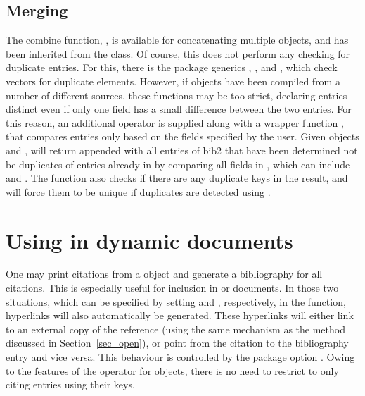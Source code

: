 \documentclass[article]{jss}\usepackage[]{graphicx}\usepackage[]{color}
\newcommand{\ourpkg}{\pkg{RefManageR}}
\newcommand{\bt}{\`{}}
\begin{document}
\subsection{Merging}
The combine function, , is available for concatenating multiple  objects, and has been inherited from the  class.  Of course, this does not perform any checking for duplicate entries.  For this, there is the  package generics , , and , which check vectors for duplicate elements.  However, if  objects have been compiled from a number of different sources, these functions may be too strict, declaring entries distinct even if only one field has a small difference between the two entries.  For this reason, an additional operator  is supplied along with a wrapper function , that compares entries only based on the fields specified by the user.  Given  objects  and ,  will return  appended with all entries of bib2 that have been determined not be duplicates of entries already in  by comparing all fields in , which can include  and .  The function also checks if there are any duplicate keys in the result, and will force them to be unique if duplicates are detected using . 

\section[Using RefManageR in dynamic documents]{Using \ourpkg{} in dynamic documents}\label{sec_cite}
One may print citations from a  object and generate a bibliography for all citations.  This is especially useful for inclusion in  or  documents.  In those two situations, which can be specified by setting  and , respectively, in the  function, hyperlinks will also automatically be generated.  These hyperlinks will either link to an external copy of the reference (using the same mechanism as the  method discussed in Section~\ref{sec_open}), or point from the citation to the bibliography entry and vice versa.  This behaviour is controlled by the package option .  Owing to the features of the \code{\bt[\bt} operator for  objects, there is no need to restrict to only citing entries using their keys.
\end{document}
